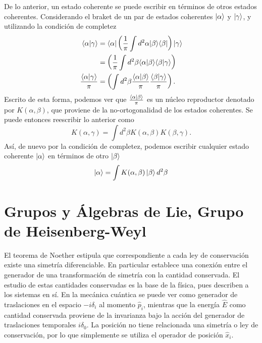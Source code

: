 De lo anterior, un estado coherente se puede escribir en términos de otros estados coherentes. Considerando el braket de un par de estados coherentes $\ket{\alpha}$ y $\ket{\gamma}$, y utilizando la condición de completez
\begin{align*}
  \langle \alpha \vert \gamma \rangle           & =  \bra{{\alpha}}\left(\frac{1}{\pi}\int d^2 \alpha \vert \beta \rangle \langle \beta \vert \right) \vert \gamma \rangle  \\
                                                & = \left(\frac{1}{\pi}\int d^2 \beta \langle \alpha\vert \beta\rangle \langle\beta\vert\gamma\rangle \right)               \\
  \frac{\langle \alpha\vert \gamma\rangle}{\pi} & = \left(\int d^2 \beta \frac{\langle \alpha\vert \beta\rangle}{\pi} \frac{\langle \beta\vert \gamma\rangle}{\pi} \right).
\end{align*}
Escrito de esta forma, podemos ver que $\frac{\braket{\alpha}{\beta}}{\pi}$ es un núcleo reproductor denotado por $K(\alpha, \beta)$, que proviene de la no-ortogonalidad de los estados coherentes. Se puede entonces reescribir lo anterior como
\begin{equation*}
  K(\alpha, \gamma) = \int d^2 \beta K(\alpha, \beta) K(\beta, \gamma).
\end{equation*}
Así, de nuevo por la condición de completez, podemos escribir cualquier estado coherente $\ket{\alpha}$ en términos de otro $\ket{\beta}$
\begin{equation*}
  \ket{\alpha} = \int K(\alpha, \beta) \ket{\beta} d^2\beta
\end{equation*}
\section{Grupos y Álgebras de Lie, Grupo de Heisenberg-Weyl}

El teorema de Noether estipula que correspondiente a cada ley de conservación existe una simetría diferenciable. En particular establece una conexión entre el generador de una transformación de simetría con la cantidad conservada. El estudio de estas cantidades conservadas es la base de la física, pues describen a los sistemas en sí. En la mecánica cuántica se puede ver como generador de traslaciones en el espacio $-i\delta_i$ al momento $\hat{p}_i$, mientras que la energía $\hat{E}$ como cantidad conservada proviene de la invarianza bajo la acción del generador de traslaciones temporales $i\delta_0$. La posición no tiene relacionada una simetría o ley de conservación, por lo que simplemente se utiliza el operador de posición $\hat{x}_i$. \cite{Schwichtenberg}

